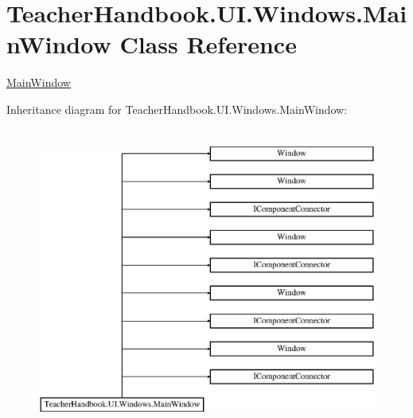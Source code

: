 \hypertarget{class_teacher_handbook_1_1_u_i_1_1_windows_1_1_main_window}{}\section{Teacher\+Handbook.\+U\+I.\+Windows.\+Main\+Window Class Reference}
\label{class_teacher_handbook_1_1_u_i_1_1_windows_1_1_main_window}


\mbox{\hyperlink{class_teacher_handbook_1_1_u_i_1_1_windows_1_1_main_window}{Main\+Window}}  


Inheritance diagram for Teacher\+Handbook.\+U\+I.\+Windows.\+Main\+Window\+:\begin{figure}[H]
\begin{center}
\leavevmode
\includegraphics[height=10.000000cm]{df/d7b/class_teacher_handbook_1_1_u_i_1_1_windows_1_1_main_window}
\end{center}
\end{figure}
